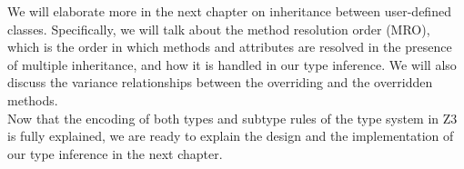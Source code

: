 We will elaborate more in the next chapter on inheritance between user-defined classes. Specifically, we will talk about the method resolution order (MRO), which is the order in which methods and attributes are resolved in the presence of multiple inheritance, and how it is handled in our type inference. We will also discuss the variance relationships between the overriding and the overridden methods.\\

Now that the encoding of both types and subtype rules of the type system in Z3 is fully explained, we are ready to explain the design and the implementation of our type inference in the next chapter.